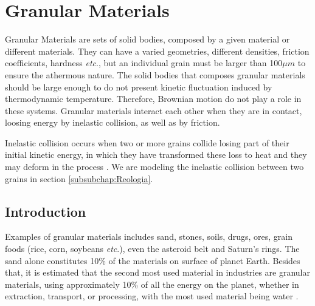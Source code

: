 
\chapter{Granular Materials}
\label{chap:Trabalhos-Relacionados}
    Granular Materials are sets of solid bodies, composed by a given material or different materials. They can have a varied geometries, different densities, friction coefficients, hardness \textit{etc}., but an individual grain must be larger than 100$\mu m$ \cite{Sands_Powders_and_Grains} to ensure the athermous nature. The solid bodies that composes granular materials should be large enough to do not present kinetic fluctuation induced by thermodynamic temperature. Therefore, Brownian motion do not play a role in these systems. Granular materials interact each other when they are in contact, loosing energy by inelastic collision, as well as by friction.

Inelastic collision occurs when two or more grains collide losing part of their initial kinetic energy, in which they have transformed these loss to heat and they may deform in the process \cite{Halliday}. We are modeling the inelastic collision between two grains in section \ref{subsubchap:Reologia}.

\section{Introduction}
\label{subsection:Teoria}

    Examples of granular materials includes sand, stones, soils, drugs, ores, grain foods (rice, corn, soybeans \textit{etc}.), even the asteroid belt and Saturn's rings. The sand alone constitutes 10\% of the materials on surface of planet Earth. Besides that, it is estimated that the second most used material in industries are granular materials, using approximately 10\% of all the energy on the planet, whether in extraction, transport, or processing, with the most used material being water \cite{Sands_Powders_and_Grains}.

